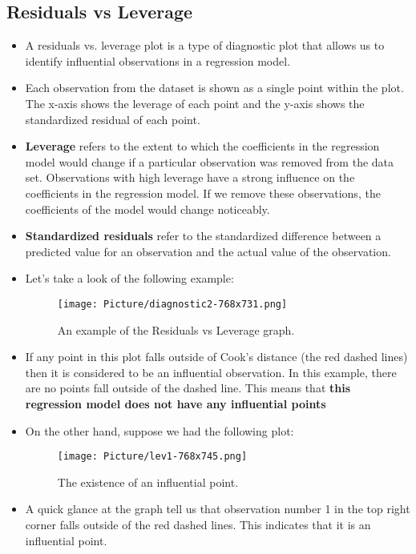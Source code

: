 \documentclass[a4paper]{article}
\begin{document}
\subsection{Residuals vs Leverage}
\begin{itemize}
    \item[] A residuals vs. leverage plot is a type of diagnostic plot that allows us to identify influential observations in a regression model.
    
    \item[] Each observation from the dataset is shown as a single point within the plot. The x-axis shows the leverage of each point and the y-axis shows the standardized residual of each point.
    
    \item[] \textbf{Leverage} refers to the extent to which the coefficients in the regression model would change if a particular observation was removed from the data set. Observations with high leverage have a strong influence on the coefficients in the regression model. If we remove these observations, the coefficients of the model would change noticeably.
    
    \item[] \textbf{Standardized residuals} refer to the standardized difference between a predicted value for an observation and the actual value of the observation.
    
    \item[] Let's take a look of the following example:
    
    \begin{figure}[H]
        \centering
        \texttt{[image: Picture/diagnostic2-768x731.png]}
        \caption{An example of the Residuals vs Leverage graph.}
        \label{6.5.1}
    \end{figure}
    
    \item[] If any point in this plot falls outside of Cook’s distance (the red dashed lines) then it is considered to be an influential observation. In this example, there are no points fall outside of the dashed line. This means that \textbf{this regression model does not have any influential points}
    
    \item[] On the other hand, suppose we had the following plot:
    
    \begin{figure}[H]
        \centering
        \texttt{[image: Picture/lev1-768x745.png]}
        \caption{The existence of an influential point.}
        \label{6.5.2}
    \end{figure}
    
    \item[] A quick glance at the graph tell us that observation number 1 in the top right corner falls outside of the red dashed lines. This indicates that it is an influential point.
\end{itemize}
\end{document}
